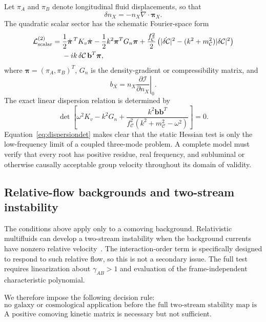\documentclass[11pt]{article}
\newcommand{\Lag}{\mathcal L}
\begin{document}
Let $\pi_A$ and $\pi_B$ denote longitudinal fluid displacements, so that
\begin{equation}
\delta n_X=-n_X\nabla\cdot\bm\pi_X.
\label{eq:densityDisplacement}
\end{equation}
The quadratic scalar sector has the schematic Fourier-space form
\begin{align}
\Lag_{\rm scalar}^{(2)}
={}&\frac12\dot{\bm\pi}^{\,T}K_v\dot{\bm\pi}
-\frac12k^2\bm\pi^{T}G_n\bm\pi
+\frac{f_{\mathcal C}^2}{2}
\left(|\dot{\delta\mathcal C}|^2-(k^2+m_{\mathcal C}^2)|\delta\mathcal C|^2\right)
\nonumber\\
&-ik\,\delta\mathcal C\,\mathbf b^T\bm\pi,
\label{eq:scalarQuadratic}
\end{align}
where $\bm\pi=(\pi_A,\pi_B)^T$, $G_n$ is the density-gradient or compressibility matrix, and
\begin{equation}
b_X=n_X\left.\frac{\partial\mathcal I}{\partial n_X}\right|_0.
\label{eq:bvector}
\end{equation}
The exact linear dispersion relation is determined by
\begin{equation}
\det\left[
\omega^2K_v-k^2G_n
+\frac{k^2\mathbf b\mathbf b^T}
{f_{\mathcal C}^2(k^2+m_{\mathcal C}^2-\omega^2)}
\right]=0.
\label{eq:dispersiondet}
\end{equation}
Equation~\eqref{eq:dispersiondet} makes clear that the static Hessian test is only the low-frequency limit of a coupled three-mode problem.  A complete model must verify that every root has positive residue, real frequency, and subluminal or otherwise causally acceptable group velocity throughout its domain of validity.

\subsection{Relative-flow backgrounds and two-stream instability}

The conditions above apply only to a comoving background.  Relativistic multifluids can develop a two-stream instability when the background currents have nonzero relative velocity~\cite{Samuelsson2009,Hawke2013}.  The interaction-order term is specifically designed to respond to such relative flow, so this is not a secondary issue.  The full test requires linearization about $\gamma_{AB}>1$ and evaluation of the frame-independent characteristic polynomial.

We therefore impose the following decision rule:
\begin{equation}
\text{no galaxy or cosmological application before the full two-stream stability map is known.}
\label{eq:twostreamrule}
\end{equation}
A positive comoving kinetic matrix is necessary but not sufficient.
\end{document}
